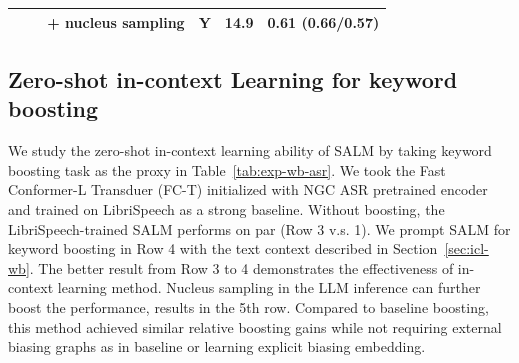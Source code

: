 \documentclass{article}
\begin{document}
\begin{table}[]
\begin{tabular}{lccc}
\ \ \ \ + nucleus sampling                                 & Y             & \textbf{14.9}  & \textbf{0.61 (0.66/0.57)}     \\
                                    \bottomrule
\end{tabular}
\vspace{-1.2em}
\end{table}

\vspace{-0.6em}
\subsection{Zero-shot in-context Learning for keyword boosting}
\label{sec:exp-word-boost}
\vspace{-0.4em}


We  study the zero-shot in-context learning ability of SALM by taking keyword boosting task as the proxy in Table~\ref{tab:exp-wb-asr}.
We took the  Fast Conformer-L Transduer (FC-T) initialized with NGC  ASR pretrained encoder and trained on LibriSpeech  as a strong baseline. 
Without boosting, the LibriSpeech-trained SALM performs on par (Row 3 v.s. 1).
We  prompt SALM for keyword boosting in Row 4 with the  text context described in Section~\ref{sec:icl-wb}. 
The better result from Row 3 to 4 demonstrates the effectiveness of  in-context learning  method. 
Nucleus sampling in the LLM inference can further boost the performance, results in the 5th row.
Compared to  baseline boosting, this method achieved similar relative boosting gains while  not requiring external biasing graphs\cite{williams2018contextual} as in  baseline or learning explicit biasing embedding\cite{pundak2018deep}.
%


\end{document}
